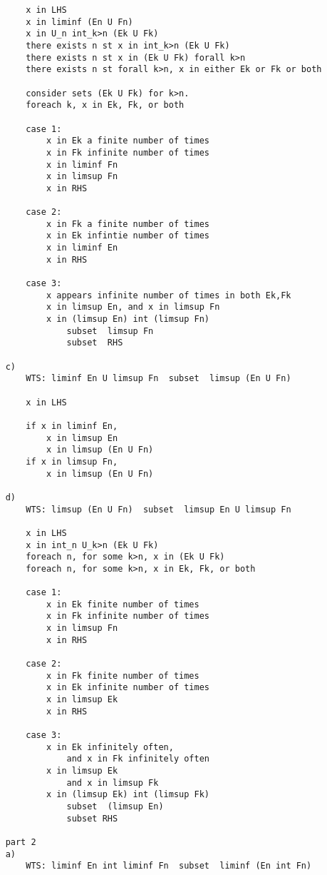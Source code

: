 \documentclass{article}
\begin{document}
\begin{flushleft}
\begin{verbatim}
        x in LHS 
        x in liminf (En U Fn)
        x in U_n int_k>n (Ek U Fk)
        there exists n st x in int_k>n (Ek U Fk)
        there exists n st x in (Ek U Fk) forall k>n
        there exists n st forall k>n, x in either Ek or Fk or both 

        consider sets (Ek U Fk) for k>n. 
        foreach k, x in Ek, Fk, or both

        case 1:
            x in Ek a finite number of times 
            x in Fk infinite number of times 
            x in liminf Fn 
            x in limsup Fn 
            x in RHS 

        case 2:
            x in Fk a finite number of times 
            x in Ek infintie number of times 
            x in liminf En 
            x in RHS 

        case 3:
            x appears infinite number of times in both Ek,Fk
            x in limsup En, and x in limsup Fn 
            x in (limsup En) int (limsup Fn)
                subset  limsup Fn
                subset  RHS 

    c) 
        WTS: liminf En U limsup Fn  subset  limsup (En U Fn)

        x in LHS 

        if x in liminf En, 
            x in limsup En 
            x in limsup (En U Fn)
        if x in limsup Fn, 
            x in limsup (En U Fn)

    d)
        WTS: limsup (En U Fn)  subset  limsup En U limsup Fn 

        x in LHS 
        x in int_n U_k>n (Ek U Fk)
        foreach n, for some k>n, x in (Ek U Fk)
        foreach n, for some k>n, x in Ek, Fk, or both 

        case 1:
            x in Ek finite number of times 
            x in Fk infinite number of times 
            x in limsup Fn 
            x in RHS 

        case 2:
            x in Fk finite number of times 
            x in Ek infinite number of times 
            x in limsup Ek 
            x in RHS 

        case 3:
            x in Ek infinitely often,
                and x in Fk infinitely often 
            x in limsup Ek
                and x in limsup Fk 
            x in (limsup Ek) int (limsup Fk)
                subset  (limsup En)
                subset RHS 

    part 2
    a) 
        WTS: liminf En int liminf Fn  subset  liminf (En int Fn)


\end{verbatim}
\end{flushleft}
\end{document}
